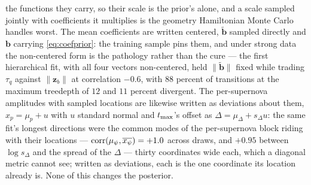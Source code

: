 \documentclass[11pt]{article}
\theoremstyle{plain}
\begin{document}
the functions they carry, so their scale is the prior's alone, and a scale sampled jointly
with coefficients it multiplies is the geometry Hamiltonian Monte Carlo handles worst. The
mean coefficients are written centered, $\tilde{\mathbf{b}}$ sampled directly and
$\mathbf{b}$ carrying \eqref{eq:coefprior}: the training sample pins them, and under strong data the non-centered
form is the pathology rather than the cure --- the first hierarchical fit, with all four
vectors non-centered, held $\|\tilde{\mathbf{b}}\|$ fixed while trading $\tau_{q}$ against
$\|\mathbf{z}_{b}\|$ at correlation $-0.6$, with $88$ percent of transitions at the maximum
treedepth of $12$ and $11$ percent divergent. The per-supernova amplitudes with sampled
locations are likewise written as deviations about them, $x_p = \mu_{p} + u$ with $u$
standard normal and $t_{\mathrm{max}}$'s offset as $\Delta = \mu_{\Delta} + s_{\Delta}u$: the same
fit's longest directions were the common modes of the per-supernova block riding with
their locations --- $\mathrm{corr}(\mu_{\psi}, \overline{x_{\psi}}) = +1.0$ across
draws, and $+0.95$ between $\log s_{\Delta}$ and the spread of the $\Delta$ --- thirty
coordinates wide each, which a diagonal metric cannot see; written as deviations, each is
the one coordinate its location already is. None of this changes the posterior.
\end{document}
